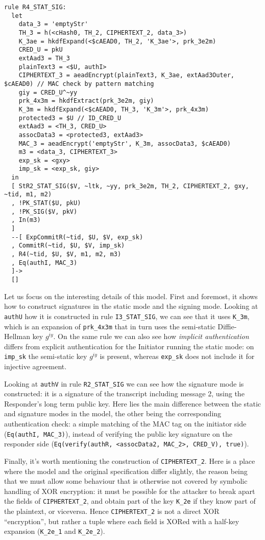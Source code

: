 \begin{lstlisting}
rule R4_STAT_SIG:
  let
    data_3 = 'emptyStr'
    TH_3 = h(<cHash0, TH_2, CIPHERTEXT_2, data_3>)
    K_3ae = hkdfExpand(<$cAEAD0, TH_2, 'K_3ae'>, prk_3e2m)
    CRED_U = pkU
    extAad3 = TH_3
    plainText3 = <$U, authI>
    CIPHERTEXT_3 = aeadEncrypt(plainText3, K_3ae, extAad3Outer, $cAEAD0) // MAC check by pattern matching
    giy = CRED_U^~yy
    prk_4x3m = hkdfExtract(prk_3e2m, giy)
    K_3m = hkdfExpand(<$cAEAD0, TH_3, 'K_3m'>, prk_4x3m)
    protected3 = $U // ID_CRED_U
    extAad3 = <TH_3, CRED_U>
    assocData3 = <protected3, extAad3>
    MAC_3 = aeadEncrypt('emptyStr', K_3m, assocData3, $cAEAD0)
    m3 = <data_3, CIPHERTEXT_3>
    exp_sk = <gxy>
    imp_sk = <exp_sk, giy>
  in
  [ StR2_STAT_SIG($V, ~ltk, ~yy, prk_3e2m, TH_2, CIPHERTEXT_2, gxy, ~tid, m1, m2) 
  , !PK_STAT($U, pkU)
  , !PK_SIG($V, pkV)
  , In(m3)
  ]
  --[ ExpCommitR(~tid, $U, $V, exp_sk)
  , CommitR(~tid, $U, $V, imp_sk)
  , R4(~tid, $U, $V, m1, m2, m3)
  , Eq(authI, MAC_3)
  ]->
  []
\end{lstlisting}

Let us focus on the interesting details of this model. First and
foremost, it shows how to construct signatures in the static mode and
the signing mode.
%
Looking at \lstinline{authU} how it is constructed in rule
\lstinline{I3_STAT_SIG}, we can see that it uses \lstinline{K_3m},
which is an expansion of \lstinline{prk_4x3m} that in turn uses the
semi-static Diffie-Hellman key $g^{iy}$.
%
On the same rule we can also see how \emph{implicit authentication}
differs from explicit authentication for the Initiator running the
static mode: on \lstinline{imp_sk} the semi-static key
$g^{iy}$ is present, whereas \lstinline{exp_sk} does not include it
for injective agreement.

Looking at \lstinline{authV} in rule \lstinline{R2_STAT_SIG} we can
see how the signature mode is constructed: it is a signature of the
transcript including message 2, using the Responder's long term public
key.
%
Here lies the main difference between the static and signature modes
in the model, the other being the corresponding authentication check:
a simple matching of the MAC tag on the initiator side
%
(\lstinline{Eq(authI, MAC_3)}), instead of verifying the public key
signature on the responder side
%
(\lstinline{Eq(verify(authR, <assocData2, MAC_2>, CRED_V), true)}).

Finally, it's worth mentioning the construction of
\lstinline{CIPHERTEXT_2}.
%
Here is a place where the model and the original specification differ
slightly, the reason being that we must allow some behaviour that is
otherwise not covered by symbolic handling of XOR encryption: it must
be possible for the attacker to break apart the fields of
\lstinline{CIPHERTEXT_2}, and obtain part of the key \lstinline{K_2e}
if they know part of the plaintext, or viceversa.
%
Hence \lstinline{CIPHERTEXT_2} is not a direct XOR ``encryption'', but
rather a tuple where each field is XORed with a half-key expansion
(\lstinline{K_2e_1} and \lstinline{K_2e_2}).

